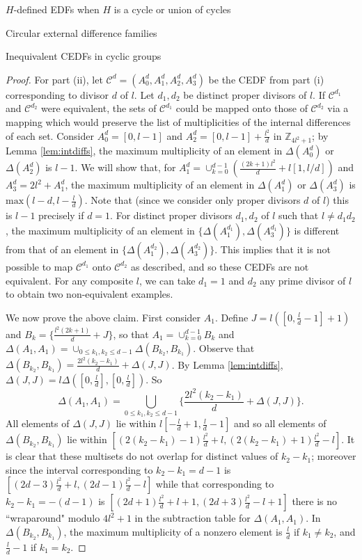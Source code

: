 \documentclass[12pt, a4paper]{article}
\theoremstyle{definition}
\begin{document}
\begin{section}{$H$-defined EDFs when $H$ is a cycle or union of cycles}
\begin{subsection}{Circular external difference families}
\begin{subsection}{Inequivalent CEDFs in cyclic groups}
\begin{proof}
For part (ii), let $\mathcal{C}^d=(A_0^{d},A_1^{d},A_2^{d},A_3^{d})$ be the CEDF from part (i) corresponding to divisor $d$ of $l$.  Let $d_1,d_2$ be distinct proper divisors of $l$. If $\mathcal{C}^{d_1}$ and $\mathcal{C}^{d_2}$ were equivalent, the sets of $\mathcal{C}^{d_1}$ could be mapped onto those of $\mathcal{C}^{d_2}$ via a mapping which would preserve the list of multiplicities of the internal differences of each set.   Consider $A_0^d=[0,l-1]$ and $A_2^d=[0,l-1]+\frac{l^2}{d}$ in $\mathbb{Z}_{4l^2+1}$; by Lemma \ref{lem:intdiffs}, the maximum multiplicity of an element in $\Delta(A_0^d)$ or $\Delta(A_2^d)$ is $l-1$.  We will show that, for $A_1^d=\cup_{k=0}^{d-1} (\frac{(2k+1)l^2}{d} +l[1,l/d])$ and $A_3^d=2l^2+A_1^d$, the maximum multiplicity of an element in $\Delta(A_1^d)$ or $\Delta(A_3^d)$ is $\mathrm{max}(l-d,l-\frac{l}{d})$. Note that (since we consider only proper divisors $d$ of $l$) this is $l-1$ precisely if $d=1$.  For distinct proper divisors $d_1,d_2$ of $l$ such that $l\neq d_1 d_2$, the maximum multiplicity of an element in $\{\Delta(A_1^{d_1}), \Delta(A_3^{d_1})\}$ is different from that of an element in  $\{\Delta(A_1^{d_2}), \Delta(A_3^{d_2})\}$.   This implies that it is not possible to map $\mathcal{C}^{d_1}$ onto $\mathcal{C}^{d_2}$ as described, and so these CEDFs are not equivalent. For any composite $l$, we can take $d_1=1$ and $d_2$ any prime divisor of $l$ to obtain two non-equivalent examples.

We now prove the above claim. First consider $A_1$.  Define $J=l([0,\frac{l}{d}-1]+1)$ and $B_k=\{\frac{l^2(2k+1)}{d}+J\}$, so that $A_1=\cup_{k=0}^{d-1} B_k$ and $\Delta(A_1,A_1)=\cup_{0 \leq k_1,k_2 \leq d-1} \Delta(B_{k_2},B_{k_1})$. Observe that $\Delta(B_{k_2},B_{k_1})=\frac{2l^2(k_2-k_1)}{d}+\Delta(J,J)$.  By Lemma \ref{lem:intdiffs}, $\Delta(J,J)=l \Delta([0,\frac{l}{d}], [0,\frac{l}{d}])$. So
\begin{equation}\label{eqn:intdiff}
\Delta(A_1,A_1)=\bigcup_{0 \leq k_1,k_2 \leq d-1}\{\frac{2l^2(k_2-k_1)}{d}+\Delta(J,J)\}.
\end{equation}
All elements of $\Delta(J,J)$ lie within $l[-\frac{l}{d}+1,\frac{l}{d}-1]$ and so all elements of $\Delta(B_{k_2},B_{k_1})$ lie within $[(2(k_2-k_1)-1)\frac{l^2}{d}+l, (2(k_2-k_1)+1)\frac{l^2}{d}-l]$.  It is clear that these multisets do not overlap for distinct values of $k_2-k_1$; moreover since the interval corresponding to $k_2-k_1=d-1$ is $[(2d-3)\frac{l^2}{d}+l,(2d-1)\frac{l^2}{d}-l]$ while that corresponding to $k_2-k_1=-(d-1)$ is $[(2d+1)\frac{l^2}{d}+l+1,(2d+3)\frac{l^2}{d}-l+1]$ there is no ``wraparound" modulo $4l^2+1$ in the subtraction table for $\Delta(A_1,A_1)$. In $\Delta(B_{k_2},B_{k_1})$, the maximum multiplicity of a nonzero element is $\frac{l}{d}$ if $k_1 \neq k_2$, and $\frac{l}{d}-1$ if $k_1=k_2$.


\end{proof}
\end{subsection}
\end{subsection}
\end{section}
\end{document}
